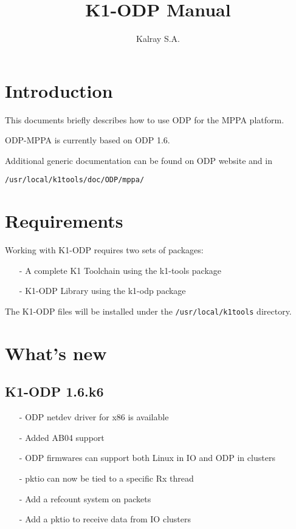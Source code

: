 \documentclass{trkalray}
\author{%
Kalray S.A.\autref{1}
}
\institute{%
\autlabel{1} \email{support@kalray.eu},
Kalray S.A.
}
\title{K1-ODP Manual}
\begin{document}
\maketitle

\tableofcontents

\newpage
\section{Introduction}

This documents briefly describes how to use ODP for the MPPA platform.

ODP-MPPA is currently based on ODP 1.6.

Additional generic documentation can be found on ODP website and in
\begin{lstlisting}
/usr/local/k1tools/doc/ODP/mppa/
\end{lstlisting}

\section{Requirements}

Working with K1-ODP requires two sets of packages:
\begin{itemize}
\item[-]{A complete K1 Toolchain using the k1-tools package}
\item[-]{K1-ODP Library using the k1-odp package}
\end{itemize}

The K1-ODP files will be installed under the
\texttt{/usr/local/k1tools} directory.

\section{What's new}
\subsection{K1-ODP 1.6.k6}
\begin{itemize}
\item[-]{ODP netdev driver for x86 is available}
\item[-]{Added AB04 support}
\item[-]{ODP firmwares can support both Linux in IO and ODP in
  clusters}
\item[-]{pktio can now be tied to a specific Rx thread}
\item[-]{Add a refcount system on packets}
\item[-]{Add a pktio to receive data from IO clusters}
\end{itemize}
\end{document}

